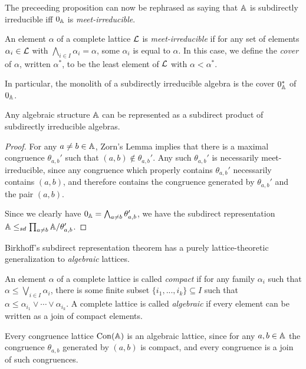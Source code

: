 \documentclass[letterpaper,11pt]{article}
\DeclareMathOperator{\Con}{Con}
\begin{document}
The preceeding proposition can now be rephrased as saying that $\mathbb{A}$ is subdirectly irreducible iff $0_{\mathbb{A}}$ is \emph{meet-irreducible}.

\begin{defn} An element $\alpha$ of a complete lattice $\mathcal{L}$ is \emph{meet-irreducible} if for any set of elements $\alpha_i \in \mathcal{L}$ with $\bigwedge_{i \in I} \alpha_i = \alpha$, some $\alpha_i$ is equal to $\alpha$. In this case, we define the \emph{cover} of $\alpha$, written $\alpha^*$, to be the least element of $\mathcal{L}$ with $\alpha < \alpha^*$.
\end{defn}

In particular, the monolith of a subdirectly irreducible algebra is the cover $0_{\mathbb{A}}^*$ of $0_{\mathbb{A}}$.

\begin{thm} Any algebraic structure $\mathbb{A}$ can be represented as a subdirect product of subdirectly irreducible algebras.
\end{thm}
\begin{proof} For any $a\ne b \in \mathbb{A}$, Zorn's Lemma implies that there is a maximal congruence $\theta_{a,b}'$ such that $(a,b) \not\in \theta_{a,b}'$. Any such $\theta_{a,b}'$ is necessarily meet-irreducible, since any congruence which properly contains $\theta_{a,b}'$ necessarily contains $(a,b)$, and therefore contains the congruence generated by $\theta_{a,b}'$ and the pair $(a,b)$.

Since we clearly have $0_{\mathbb{A}} = \bigwedge_{a \ne b} \theta_{a,b}'$, we have the subdirect representation $\mathbb{A} \le_{sd} \prod_{a \ne b} \mathbb{A}/\theta_{a,b}'$.
\end{proof}

Birkhoff's subdirect representation theorem has a purely lattice-theoretic generalization to \emph{algebraic} lattices.

\begin{defn} An element $\alpha$ of a complete lattice is called \emph{compact} if for any family $\alpha_i$ such that $\alpha \le \bigvee_{i \in I} \alpha_i$, there is some finite subset $\{i_1, ..., i_k\} \subseteq I$ such that $\alpha \le \alpha_{i_1} \vee \cdots \vee \alpha_{i_k}$. A complete lattice is called \emph{algebraic} if every element can be written as a join of compact elements.
\end{defn}

Every congruence lattice $\Con(\bA)$ is an algebraic lattice, since for any $a,b \in \mathbb{A}$ the congruence $\theta_{a,b}$ generated by $(a,b)$ is compact, and every congruence is a join of such congruences.
\end{document}
